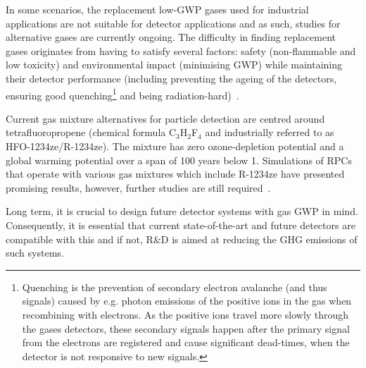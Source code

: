 \documentclass[../SustainableHEP.tex]{subfiles}
\begin{document}
In some scenarios, the replacement low-GWP gases used for industrial applications are not suitable for detector applications and as such, studies for alternative gases are currently ongoing. The difficulty in finding replacement gases originates from having to satisfy several factors: safety (non-flammable and low toxicity) and environmental impact (minimising GWP) while maintaining their detector performance (including preventing the ageing of the detectors, ensuring good quenching\footnote{Quenching is the prevention of secondary electron avalanche (and thus signals) caused by e.g. photon emissions of the positive ions in the gas when recombining with electrons. As the positive ions travel more slowly through the gases detectors, these secondary signals happen after the primary signal from the electrons are registered and cause significant dead-times, when the detector is not responsive to new signals.} and being radiation-hard)~\cite{Bloom:2022gux}.

Current gas mixture alternatives for particle detection are centred around tetrafluoropropene (chemical formula C$_3$H$_2$F$_4$ and industrially referred to as HFO-1234ze/R-1234ze). The mixture has zero ozone-depletion potential and a global warming potential over a span of 100 years below 1. Simulations of RPCs that operate with various gas mixtures which include R-1234ze have presented promising results, however, further studies are still required~\cite{Fan:2022azj_ref3,Proto:2021taf_ref4}.

Long term, it is crucial to design future detector systems with gas GWP in mind. Consequently, it is essential that current state-of-the-art and future detectors are compatible with this and if not, R\&D is aimed at reducing the GHG emissions of such systems.
\end{document}
